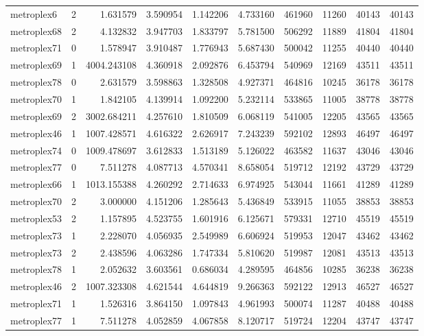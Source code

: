 \documentclass[../../../thesis.tex]{subfiles}
\begin{document}
\begin{longtable}{|l|r|r|r|r|r|r|r|r|r|}
metroplex6 & 2 & 1.631579 & 3.590954 & 1.142206 & 4.733160 & 461960 & 11260 & 40143 & 40143 \\
metroplex68 & 2 & 4.132832 & 3.947703 & 1.833797 & 5.781500 & 506292 & 11889 & 41804 & 41804 \\
metroplex71 & 0 & 1.578947 & 3.910487 & 1.776943 & 5.687430 & 500042 & 11255 & 40440 & 40440 \\
metroplex69 & 1 & 4004.243108 & 4.360918 & 2.092876 & 6.453794 & 540969 & 12169 & 43511 & 43511 \\
metroplex78 & 0 & 2.631579 & 3.598863 & 1.328508 & 4.927371 & 464816 & 10245 & 36178 & 36178 \\
metroplex70 & 1 & 1.842105 & 4.139914 & 1.092200 & 5.232114 & 533865 & 11005 & 38778 & 38778 \\
metroplex69 & 2 & 3002.684211 & 4.257610 & 1.810509 & 6.068119 & 541005 & 12205 & 43565 & 43565 \\
metroplex46 & 1 & 1007.428571 & 4.616322 & 2.626917 & 7.243239 & 592102 & 12893 & 46497 & 46497 \\
metroplex74 & 0 & 1009.478697 & 3.612833 & 1.513189 & 5.126022 & 463582 & 11637 & 43046 & 43046 \\
metroplex77 & 0 & 7.511278 & 4.087713 & 4.570341 & 8.658054 & 519712 & 12192 & 43729 & 43729 \\
metroplex66 & 1 & 1013.155388 & 4.260292 & 2.714633 & 6.974925 & 543044 & 11661 & 41289 & 41289 \\
metroplex70 & 2 & 3.000000 & 4.151206 & 1.285643 & 5.436849 & 533915 & 11055 & 38853 & 38853 \\
metroplex53 & 2 & 1.157895 & 4.523755 & 1.601916 & 6.125671 & 579331 & 12710 & 45519 & 45519 \\
metroplex73 & 1 & 2.228070 & 4.056935 & 2.549989 & 6.606924 & 519953 & 12047 & 43462 & 43462 \\
metroplex73 & 2 & 2.438596 & 4.063286 & 1.747334 & 5.810620 & 519987 & 12081 & 43513 & 43513 \\
metroplex78 & 1 & 2.052632 & 3.603561 & 0.686034 & 4.289595 & 464856 & 10285 & 36238 & 36238 \\
metroplex46 & 2 & 1007.323308 & 4.621544 & 4.644819 & 9.266363 & 592122 & 12913 & 46527 & 46527 \\
metroplex71 & 1 & 1.526316 & 3.864150 & 1.097843 & 4.961993 & 500074 & 11287 & 40488 & 40488 \\
metroplex77 & 1 & 7.511278 & 4.052859 & 4.067858 & 8.120717 & 519724 & 12204 & 43747 & 43747 \\

\end{longtable}
\end{document}
